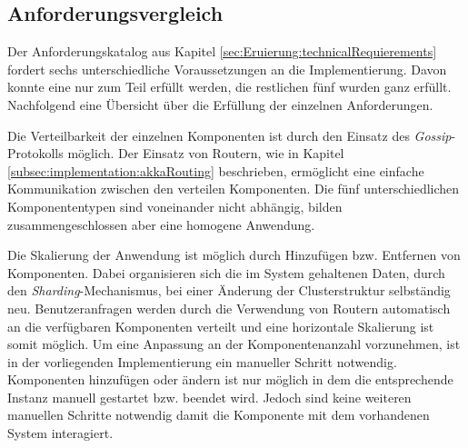 \subsection{Anforderungsvergleich}
Der Anforderungskatalog aus Kapitel \ref{sec:Eruierung:technicalRequierements} fordert sechs unterschiedliche Voraussetzungen an die Implementierung. Davon konnte eine nur zum Teil erfüllt werden, die restlichen fünf wurden ganz erfüllt. \\
Nachfolgend eine Übersicht über die Erfüllung der einzelnen Anforderungen.
\begin{enumerate}
    Die Verteilbarkeit der einzelnen Komponenten ist durch den Einsatz des \textit{Gossip}-Protokolls möglich. Der Einsatz von Routern, wie in Kapitel \ref{subsec:implementation:akkaRouting} beschrieben, ermöglicht eine einfache Kommunikation  zwischen den verteilen Komponenten. Die fünf unterschiedlichen Komponententypen sind voneinander nicht abhängig, bilden zusammengeschlossen aber eine homogene Anwendung.

    Die Skalierung der Anwendung ist möglich durch Hinzufügen bzw. Entfernen von Komponenten. Dabei organisieren sich die im System gehaltenen Daten, durch den \textit{Sharding}-Mechanismus, bei einer Änderung der Clusterstruktur selbständig neu. Benutzeranfragen werden durch die Verwendung von Routern automatisch an die verfügbaren Komponenten verteilt und eine horizontale Skalierung ist somit möglich. Um eine Anpassung an der Komponentenanzahl vorzunehmen, ist  in der vorliegenden Implementierung ein manueller Schritt notwendig. Komponenten hinzufügen oder ändern ist nur möglich in dem die entsprechende Instanz manuell gestartet bzw. beendet wird. Jedoch sind keine weiteren manuellen Schritte notwendig damit die Komponente mit dem vorhandenen System interagiert. 
% 
% 


\end{enumerate}
